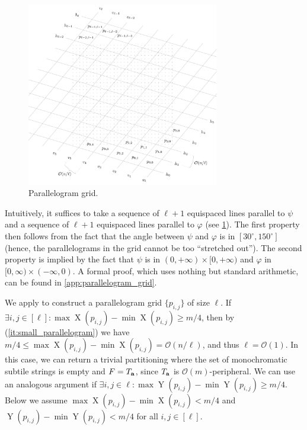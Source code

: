 \documentclass[twoside,leqno]{article}
\renewcommand{\O}{\mathcal{O}}
\renewcommand{\phi}{\varphi}
\DeclareMathOperator*{\X}{X}
\DeclareMathOperator*{\Y}{Y}
\begin{document}
\begin{figure}[h!]
        \centering
        \includegraphics[width=0.75\textwidth]{drawings/lemma5}
        \caption{Parallelogram grid.}
        \label{figure:lemma5}
\end{figure}

Intuitively, it suffices to take a sequence of $\ell+1$ equispaced lines parallel to $\psi$ and a sequence of $\ell+1$ equispaced lines parallel to $\phi$ (see \cref{figure:lemma5}). The first property then follows from the fact that the angle between $\psi$ and $\varphi$ is in $[30^\circ,150^\circ]$ (hence, the parallelograms in the grid cannot be too ``stretched out''). The second property is implied by the fact that $\psi$ is in $(0,+\infty)\times [0,+\infty)$ and $\phi$ in $[0,\infty) \times (-\infty,0)$. A formal proof, which uses nothing but standard arithmetic, can be found in \cref{app:parallelogram_grid}.  

We apply  to construct a parallelogram grid $\{p_{i,j}\}$ of size $\ell$. If $\exists i, j \in [\ell] : \max \X(p_{i, j}) - \min \X(p_{i, j}) \ge m / 4$, then by  (\ref{it:small_parallelogram}) we have $m / 4 \le \max \X(p_{i, j}) - \min \X(p_{i, j}) = \O(n / \ell)$, and thus $\ell = \O(1)$. In this case, we can return a trivial partitioning where the set of monochromatic subtile strings is empty and $F = T_\mathbf{a}$, since $T_\mathbf{a}$ is $\O(m)$-peripheral. We can use an analogous argument if $\exists i,j \in \ell : \max \Y(p_{i, j}) - \min \Y(p_{i, j}) \ge m / 4$. Below we assume $\max \X(p_{i, j}) - \min \X(p_{i, j}) < m / 4$ and $\Y(p_{i, j}) - \min \Y(p_{i, j}) < m / 4$ for all $i, j \in [\ell]$. 
\end{document}
